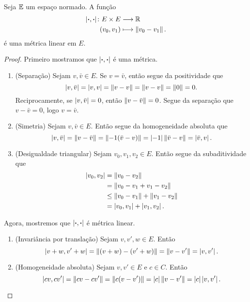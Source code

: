 \begin{proposition}
Seja $\mathbb{E}$ um espaço normado. A função
	\begin{align*}
	{\left\vert{\bm{\cdot}},{\bm{\cdot}}\right\vert}\colon {E \times E} &\longrightarrow {\mathbb{R}} \\{(v_0,v_1)} &\longmapsto \left\Vert{v_0 - v_1}\right\Vert.
	\end{align*}
é uma métrica linear em $E$.
\end{proposition}
\begin{proof}
Primeiro mostramos que $\left\vert{\bm{\cdot}},{\bm{\cdot}}\right\vert$ é uma métrica.
	\begin{enumerate}
	\item (Separação) Sejam $v,\bar v \in E$. Se $v = \bar v$, então segue da positividade que
	\begin{equation*}
	\left\vert{v},{\bar v}\right\vert = \left\vert{v},{v}\right\vert = \left\Vert{v - v}\right\Vert = \left\Vert{v-v}\right\Vert=\left\Vert{0}\right\Vert=0.
	\end{equation*}
Reciprocamente, se $\left\vert{v},{\bar v}\right\vert=0$, então $\left\Vert{v-\bar v}\right\Vert=0$. Segue da separação que $v-\bar v=0$, logo $v=\bar v$.

	\item (Simetria)  Sejam $v,\bar v \in E$. Então segue da homogeneidade absoluta que
	\begin{equation*}
	\left\vert{v},{\bar v}\right\vert=\left\Vert{v-\bar v}\right\Vert=\left\Vert{-1(\bar v -v)}\right\Vert=\left\vert{-1}\right\vert\left\Vert{\bar v - v}\right\Vert=\left\vert{\bar v},{v}\right\vert.
	\end{equation*}
	
	\item (Desigualdade triangular) Sejam $v_0,v_1,v_2 \in E$. Então segue da subaditividade que
	\begin{align*}
	\left\vert{v_0},{v_2}\right\vert &= \left\Vert{v_0-v_2}\right\Vert \\
		&=\left\Vert{v_0-v_1+v_1-v_2}\right\Vert \\
		&\leq \left\Vert{v_0-v_1}\right\Vert+\left\Vert{v_1-v_2}\right\Vert \\
		&=\left\vert{v_0},{v_1}\right\vert+\left\vert{v_1},{v_2}\right\vert.
	\end{align*}	
	\end{enumerate}
Agora, mostremos que $\left\vert{\bm{\cdot}},{\bm{\cdot}}\right\vert$ é métrica linear.
	\begin{enumerate}
	\item (Invariância por translação) Sejam $v,v',w \in E$. Então
		\begin{equation*}
		\left\vert{v+w},{v'+w}\right\vert = \left\Vert{(v+w) - (v'+w)}\right\Vert = \left\Vert{v-v'}\right\Vert = \left\vert{v},{v'}\right\vert.
		\end{equation*}
	
	\item (Homogeneidade absoluta) Sejam $v,v' \in E$ e $c \in C$. Então
		\begin{equation*}
		\left\vert{cv},{cv'}\right\vert = \left\Vert{cv-cv'}\right\Vert = \left\Vert{c(v-v')}\right\Vert = \left\vert{c}\right\vert\left\Vert{v-v'}\right\Vert = \left\vert{c}\right\vert\left\vert{v},{v'}\right\vert. \qedhere
		\end{equation*}
	\end{enumerate}
\end{proof}

